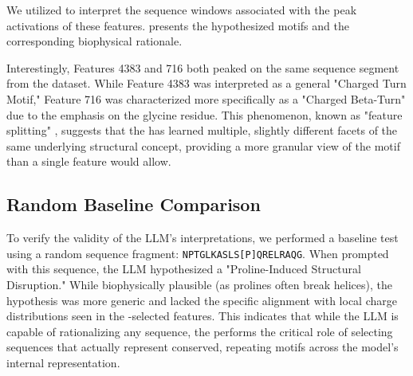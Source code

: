 We utilized \gpt to interpret the sequence windows associated with the peak activations of these features.  presents the hypothesized motifs and the corresponding biophysical rationale.

\begin{table}[h]
\centering
\caption{LLM-generated hypotheses for selected \sae features. Sequence windows show 10 residues flanking the peak activation site (indicated in brackets).}
\label{tab:hypotheses}
\end{table}

Interestingly, Features 4383 and 716 both peaked on the same sequence segment from the dataset. While Feature 4383 was interpreted as a general "Charged Turn Motif," Feature 716 was characterized more specifically as a "Charged Beta-Turn" due to the emphasis on the glycine residue. This phenomenon, known as "feature splitting" \cite{simon2024interplm}, suggests that the \sae has learned multiple, slightly different facets of the same underlying structural concept, providing a more granular view of the motif than a single feature would allow.

\subsection{Random Baseline Comparison}
To verify the validity of the LLM's interpretations, we performed a baseline test using a random sequence fragment: \texttt{NPTGLKASLS[P]QRELRAQG}. When prompted with this sequence, the LLM hypothesized a "Proline-Induced Structural Disruption." While biophysically plausible (as prolines often break helices), the hypothesis was more generic and lacked the specific alignment with local charge distributions seen in the \sae-selected features. This indicates that while the LLM is capable of rationalizing any sequence, the \sae performs the critical role of selecting sequences that actually represent conserved, repeating motifs across the model's internal representation.
